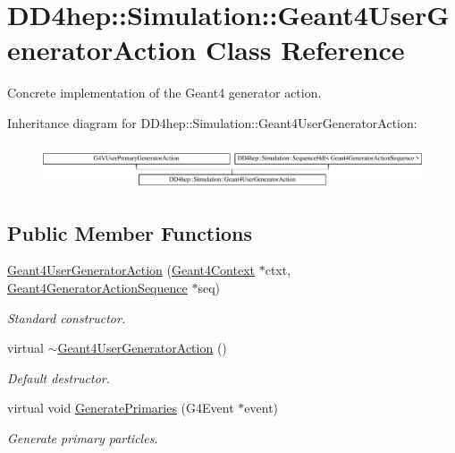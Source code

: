 \hypertarget{class_d_d4hep_1_1_simulation_1_1_geant4_user_generator_action}{}\section{D\+D4hep\+:\+:Simulation\+:\+:Geant4\+User\+Generator\+Action Class Reference}
\label{class_d_d4hep_1_1_simulation_1_1_geant4_user_generator_action}


Concrete implementation of the Geant4 generator action.  


Inheritance diagram for D\+D4hep\+:\+:Simulation\+:\+:Geant4\+User\+Generator\+Action\+:\begin{figure}[H]
\begin{center}
\leavevmode
\includegraphics[height=1.323877cm]{class_d_d4hep_1_1_simulation_1_1_geant4_user_generator_action}
\end{center}
\end{figure}
\subsection*{Public Member Functions}
\begin{DoxyCompactItemize}
\item 
\hyperlink{class_d_d4hep_1_1_simulation_1_1_geant4_user_generator_action_afc51c8fd156ae7c8a344d1378c2b2026}{Geant4\+User\+Generator\+Action} (\hyperlink{class_d_d4hep_1_1_simulation_1_1_geant4_context}{Geant4\+Context} $\ast$ctxt, \hyperlink{class_d_d4hep_1_1_simulation_1_1_geant4_generator_action_sequence}{Geant4\+Generator\+Action\+Sequence} $\ast$seq)
\begin{DoxyCompactList}\small\item\em Standard constructor. \end{DoxyCompactList}\item 
virtual \hyperlink{class_d_d4hep_1_1_simulation_1_1_geant4_user_generator_action_a4fa904700f82d5bcce7a2c5d774d529f}{$\sim$\+Geant4\+User\+Generator\+Action} ()
\begin{DoxyCompactList}\small\item\em Default destructor. \end{DoxyCompactList}\item 
virtual void \hyperlink{class_d_d4hep_1_1_simulation_1_1_geant4_user_generator_action_a6e5a2cb71388c8358f6fa8679ca9cf69}{Generate\+Primaries} (G4\+Event $\ast$event)
\begin{DoxyCompactList}\small\item\em Generate primary particles. \end{DoxyCompactList}\end{DoxyCompactItemize}
